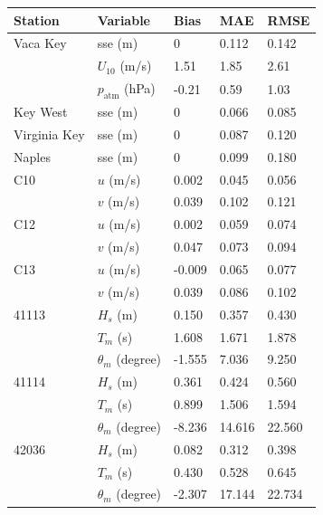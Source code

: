 \begin{table}
    \centering
    \begin{tabular}{|p{2.8cm}p{3cm}p{1.8cm}p{1.8cm}p{1.8cm}|}
        \hline
        \textbf{Station} & \textbf{Variable} & \textbf{Bias} & \textbf{MAE} & \textbf{RMSE} \\
        \hline
        Vaca Key     & sse (m)              & 0     & 0.112 & 0.142 \\
                     & $U_{10}$ (m/s)       & 1.51  & 1.85  & 2.61 \\
                     & $p_\text{atm}$ (hPa) & -0.21 & 0.59  & 1.03 \\ 
        Key West     & sse (m)              & 0     & 0.066 & 0.085 \\
        Virginia Key & sse (m)              & 0     & 0.087 & 0.120 \\
        Naples       & sse (m)              & 0     & 0.099 & 0.180 \\
        \hline
        C10   & $u$ (m/s)           &  0.002 &  0.045 &  0.056 \\
              & $v$ (m/s)           &  0.039 &  0.102 &  0.121 \\
        C12   & $u$ (m/s)           &  0.002 &  0.059 &  0.074 \\
              & $v$ (m/s)           &  0.047 &  0.073 &  0.094 \\
        C13   & $u$ (m/s)           & -0.009 &  0.065 &  0.077 \\
              & $v$ (m/s)           &  0.039 &  0.086 &  0.102 \\
        \hline
        41113 & $H_s$ (m)           &  0.150 &  0.357 &  0.430 \\
              & $T_m$ (s)           &  1.608 &  1.671 &  1.878 \\
              & $\theta_m$ (degree) & -1.555 &  7.036 &  9.250 \\
        41114 & $H_s$ (m)           &  0.361 &  0.424 &  0.560 \\
              & $T_m$ (s)           &  0.899 &  1.506 &  1.594 \\
              & $\theta_m$ (degree) & -8.236 & 14.616 & 22.560 \\
        42036 & $H_s$ (m)           &  0.082 &  0.312 &  0.398 \\
              & $T_m$ (s)           &  0.430 &  0.528 &  0.645 \\
              & $\theta_m$ (degree) & -2.307 & 17.144 & 22.734 \\

\end{tabular}
\end{table}
